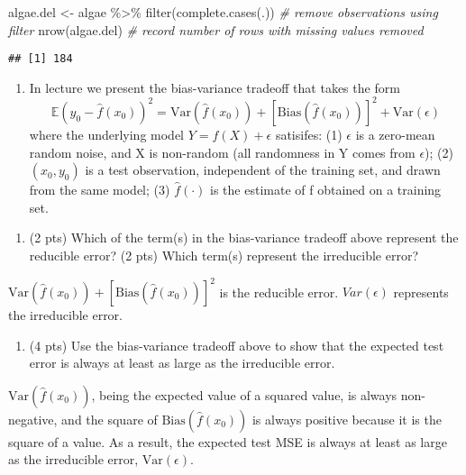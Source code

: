 \documentclass[
]{article}
\newenvironment{Shaded}{\begin{snugshade}}{\end{snugshade}}
\newcommand{\CommentTok}[1]{\textcolor[rgb]{0.56,0.35,0.01}{\textit{#1}}}
\newcommand{\FunctionTok}[1]{\textcolor[rgb]{0.00,0.00,0.00}{#1}}
\newcommand{\NormalTok}[1]{#1}
\newcommand{\OtherTok}[1]{\textcolor[rgb]{0.56,0.35,0.01}{#1}}
\newcommand{\SpecialCharTok}[1]{\textcolor[rgb]{0.00,0.00,0.00}{#1}}
\providecommand{\tightlist}{%
  \setlength{\itemsep}{0pt}\setlength{\parskip}{0pt}}
\begin{document}
\begin{Shaded}
\begin{Highlighting}[]
\NormalTok{algae.del }\OtherTok{\textless{}{-}}\NormalTok{ algae }\SpecialCharTok{\%\textgreater{}\%} \FunctionTok{filter}\NormalTok{(}\FunctionTok{complete.cases}\NormalTok{(.)) }\CommentTok{\# remove observations using filter}
\FunctionTok{nrow}\NormalTok{(algae.del) }\CommentTok{\# record number of rows with missing values removed}
\end{Highlighting}
\end{Shaded}

\begin{verbatim}
## [1] 184
\end{verbatim}

\begin{enumerate}
\def\labelenumi{\arabic{enumi}.}
\setcounter{enumi}{3}
\tightlist
\item
  In lecture we present the bias-variance tradeoff that takes the form
  \[\mathbb{E}(y_0-\hat{f}(x_0))^2 = \text{Var}(\hat{f}(x_0))+[\text{Bias}(\hat{f}(x_0))]^2+\text{Var}(\epsilon)\]
  where the underlying model \(Y = f(X) + \epsilon\) satisifes: (1)
  \(\epsilon\) is a zero-mean random noise, and X is non-random (all
  randomness in Y comes from \(\epsilon\)); (2) \((x_0, y_0)\) is a test
  observation, independent of the training set, and drawn from the same
  model; (3) \(\hat{f}(\cdot)\) is the estimate of f obtained on a
  training set.
\end{enumerate}

\begin{enumerate}
\def\labelenumi{\alph{enumi}.}
\tightlist
\item
  (2 pts) Which of the term(s) in the bias-variance tradeoff above
  represent the reducible error? (2 pts) Which term(s) represent the
  irreducible error?
\end{enumerate}

\(\text{Var}(\hat{f}(x_0))+[\text{Bias}(\hat{f}(x_0))]^2\) is the
reducible error. \(Var(\epsilon)\) represents the irreducible error.

\begin{enumerate}
\def\labelenumi{\alph{enumi}.}
\setcounter{enumi}{1}
\tightlist
\item
  (4 pts) Use the bias-variance tradeoff above to show that the expected
  test error is always at least as large as the irreducible error.
\end{enumerate}

\(\text{Var}(\hat{f}(x_0))\), being the expected value of a squared
value, is always non-negative, and the square of
\(\text{Bias}(\hat{f}(x_0))\) is always positive because it is the
square of a value. As a result, the expected test MSE is always at least
as large as the irreducible error, \(\text{Var}(\epsilon)\).
\end{document}
